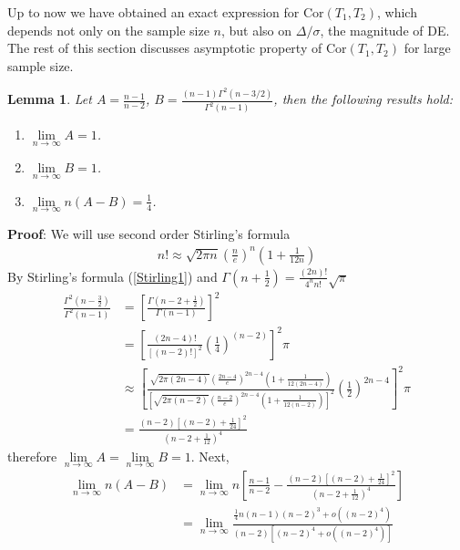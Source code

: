 \documentclass[12pt, a4paper]{article}
\newtheorem{lemma}{Lemma}
\begin{document}
\begin{appendix}
			Up to now we have obtained an exact expression for $\text{Cor}(T_1, T_2)$, which depends not only on
			the sample size $n$, but also on $\Delta/\sigma$, the magnitude of DE. The rest of this section
			discusses asymptotic  property of $\text{Cor}(T_1, T_2)$ for large sample size.
			\begin{lemma}\label{llemmaLimit}
				Let $A = \frac{n-1}{n-2}$, $B= \frac{(n-1)\Gamma^2(n-3/2)}{\Gamma^2(n-1)}$, then the following
				results hold:
				\begin{enumerate}
					\item $\lim\limits_{n\rightarrow \infty} A = 1$.
					\item $\lim\limits_{n\rightarrow \infty} B = 1$.
					\item $\lim\limits_{n\rightarrow \infty} n(A-B) = \frac{1}{4}$. 
				\end{enumerate}
			\end{lemma}
			\textbf{Proof}: We will use second order Stirling's formula
			\begin{align}\label{sStirling1}
			n! \approx \sqrt{2\pi n}\left(\frac{n}{e}\right)^n(1 + \frac{1}{12n})
			\end{align}
			By Stirling's formula (\ref{Stirling1}) and  $\Gamma(n + \frac{1}{2}) =
			\frac{(2n)!}{4^nn!}\sqrt{\pi}$ 
			\begin{align*}
			\frac{\Gamma^2(n - \frac{3}{2}) }{\Gamma^2(n-1)} & =\left[\frac{\Gamma(n -2 +
				\frac{1}{2})}{\Gamma(n-1)}\right]^2\\
			&  = \left[\frac{(2n-4)!}{[(n-2)!]^2}\left(\frac{1}{4}\right)^{(n-2)}\right]^2\pi\\
			& \approx \left[\frac{\sqrt{2\pi(2n-4)}\left(\frac{2n-4}{e}\right)^{2n-4}\left(1 +
				\frac{1}{12(2n-4)}\right)}{\left[\sqrt{2\pi(n-2)}\left(\frac{n-2}{e}\right)^{2n-4}\left(1 +
				\frac{1}{12(n-2)}\right)\right]^2}\left(\frac{1}{2}\right)^{2n-4}\right]^2\pi \\
			& = \frac{(n-2)\left[(n-2) + \frac{1}{24}\right]^2}{(n-2 + \frac{1}{12})^4}
			\end{align*}
			therefore $\lim\limits _{n\rightarrow\infty}A = \lim\limits_{n\rightarrow\infty}B = 1$. Next, 
			\begin{align*}
			\lim\limits_{n\rightarrow \infty} n(A-B)& =\lim\limits_{n\rightarrow \infty} n\left[\frac{n-1}{n-2}
			- \frac{(n-2)\left[(n-2) + \frac{1}{24}\right]^2}{(n-2 + \frac{1}{12})^4}\right]\\
			& = \lim\limits_{n\rightarrow \infty}  \frac{\frac{1}{4} n(n-1)(n-2)^3 +
				o\left((n-2)^4\right)}{(n-2)\left[(n-2)^4 +  o\left((n-2)^4\right)\right]}\\

\end{align*}
\end{appendix}
\end{document}
